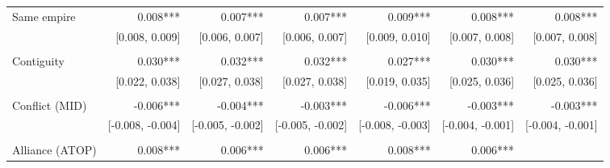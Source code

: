 \begin{table}[!h]
\begin{tabular}{lllllll}
\multicolumn{1}{l}{Same empire} &
  \multicolumn{1}{|r}{0.008***} &
  \multicolumn{1}{r}{0.007***} &
  \multicolumn{1}{r}{0.007***} &
  \multicolumn{1}{r}{0.009***} &
  \multicolumn{1}{r}{0.008***} &
  \multicolumn{1}{r}{0.008***} \\
\multicolumn{1}{l}{} &
  \multicolumn{1}{|r}{[0.008,   0.009]} &
  \multicolumn{1}{r}{[0.006,   0.007]} &
  \multicolumn{1}{r}{[0.006,   0.007]} &
  \multicolumn{1}{r}{[0.009,   0.010]} &
  \multicolumn{1}{r}{[0.007,   0.008]} &
  \multicolumn{1}{r}{[0.007,   0.008]} \\
\multicolumn{1}{l}{} &
  \multicolumn{1}{|r}{} &
  \multicolumn{1}{r}{} &
  \multicolumn{1}{r}{} &
  \multicolumn{1}{r}{} &
  \multicolumn{1}{r}{} &
  \multicolumn{1}{r}{} \\
\multicolumn{1}{l}{Contiguity} &
  \multicolumn{1}{|r}{0.030***} &
  \multicolumn{1}{r}{0.032***} &
  \multicolumn{1}{r}{0.032***} &
  \multicolumn{1}{r}{0.027***} &
  \multicolumn{1}{r}{0.030***} &
  \multicolumn{1}{r}{0.030***} \\
\multicolumn{1}{l}{} &
  \multicolumn{1}{|r}{[0.022,   0.038]} &
  \multicolumn{1}{r}{[0.027,   0.038]} &
  \multicolumn{1}{r}{[0.027,   0.038]} &
  \multicolumn{1}{r}{[0.019,   0.035]} &
  \multicolumn{1}{r}{[0.025,   0.036]} &
  \multicolumn{1}{r}{[0.025,   0.036]} \\
\multicolumn{1}{l}{} &
  \multicolumn{1}{|r}{} &
  \multicolumn{1}{r}{} &
  \multicolumn{1}{r}{} &
  \multicolumn{1}{r}{} &
  \multicolumn{1}{r}{} &
  \multicolumn{1}{r}{} \\
\multicolumn{1}{l}{Conflict (MID)} &
  \multicolumn{1}{|r}{-0.006***} &
  \multicolumn{1}{r}{-0.004***} &
  \multicolumn{1}{r}{-0.003***} &
  \multicolumn{1}{r}{-0.006***} &
  \multicolumn{1}{r}{-0.003***} &
  \multicolumn{1}{r}{-0.003***} \\
\multicolumn{1}{l}{} &
  \multicolumn{1}{|r}{[-0.008,  -0.004]} &
  \multicolumn{1}{r}{[-0.005,  -0.002]} &
  \multicolumn{1}{r}{[-0.005,  -0.002]} &
  \multicolumn{1}{r}{[-0.008,  -0.003]} &
  \multicolumn{1}{r}{[-0.004,  -0.001]} &
  \multicolumn{1}{r}{[-0.004,  -0.001]} \\
\multicolumn{1}{l}{} &
  \multicolumn{1}{|r}{} &
  \multicolumn{1}{r}{} &
  \multicolumn{1}{r}{} &
  \multicolumn{1}{r}{} &
  \multicolumn{1}{r}{} &
  \multicolumn{1}{r}{} \\
\multicolumn{1}{l}{Alliance (ATOP)} &
  \multicolumn{1}{|r}{0.008***} &
  \multicolumn{1}{r}{0.006***} &
  \multicolumn{1}{r}{0.006***} &
  \multicolumn{1}{r}{0.008***} &
  \multicolumn{1}{r}{0.006***} &

\end{tabular}
\end{table}
